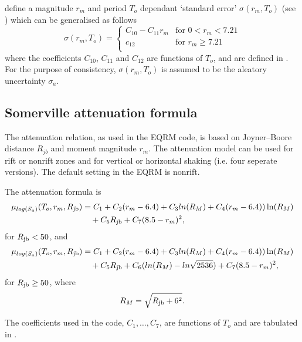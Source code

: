 \cite{dr_Sadigh97a} define a magnitude $r_m$ and period $T_o$
dependant `standard error' $\sigma(r_m,T_o)$ (see \citealt[Table
3]{dr_Sadigh97a}) which can be generalised as follows
\begin{equation}
\sigma(r_m,T_o) = \left \{ \begin{array}{ll}
C_{10}-C_{11}r_m & \textrm{for $0<r_m<7.21$} \\
c_{12} & \textrm{for $r_m \geq 7.21$} \\
\end{array} \right.
\end{equation}
where the coefficients $C_{10}$, $C_{11}$ and $C_{12}$ are
functions of $T_o$, and are defined in \cite[Table
A-14]{dr_Campbell03a}. For the purpose of
consistency, $\sigma(r_m,T_o)$ is assumed to be the aleatory
uncertainty $\sigma_a$.


\subsection{Somerville attenuation formula}
The \citet{dr_Somerville01a} attenuation relation, as used in the
EQRM code, is based on Joyner--Boore distance $R_{jb}$ and moment
magnitude $r_m$. The \citet{dr_Somerville01a} attenuation model
can be used for rift or nonrift zones and for vertical or
horizontal shaking (i.e. four seperate versions). The default
setting in the EQRM is nonrift.



The attenuation formula is
\begin{equation}
\begin{split}
\mu_{log(S_a)}(T_o,r_m,\Rjb) &= C_1 + C_2(r_m-6.4) + C_3ln(R_M) + C_4(r_m-6.4))\ln(R_M) \\
       &\quad  + C_5 \Rjb+ C_7(8.5-r_m)^2,
\end{split}
\end{equation}
for $\Rjb<50$, and
\begin{equation}
\begin{split}
\mu_{log(S_a)}(T_o,r_m,\Rjb) &= C_1 + C_2(r_m-6.4) + C_3ln(R_M) + C_4(r_m-6.4))\ln(R_M) \\
       &\quad  + C_5 \Rjb + C_6(ln(R_M)-ln\sqrt{2536}) +    C_7(8.5-r_m)^2,
\end{split}
\end{equation}
for $\Rjb \geq 50$, where
\begin{equation}
 R_M = \sqrt{ \Rjb + 6^2 }.
\end{equation}

The coefficients used in the code, $C_1,\ldots,C_7$, are functions
of $T_o$ and are tabulated in \citet[Table 9]{dr_Somerville01a}.

